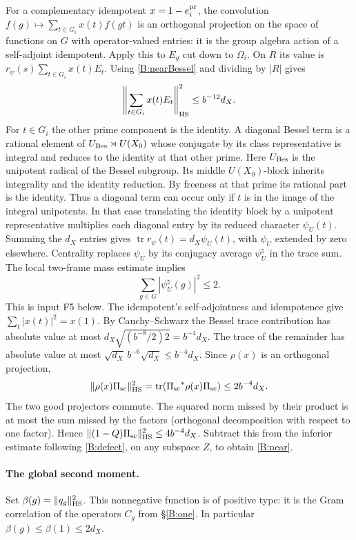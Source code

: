 For a complementary idempotent \(x=1-e_i^{\rm pr}\), the convolution
\(f(g)\mapsto\sum_{t\in G_i}x(t)f(gt)\) is an orthogonal projection
on the space of functions on \(G\) with operator-valued entries:
it is the group algebra action of a self-adjoint idempotent.
Apply this to \(E_g\) cut down to \(\Omega_i\). On \(R\)
its value is \(r_\psi(s)\sum_{t\in G_i}x(t)E_t\).
Using \eqref{B:nearBessel} and dividing by \(|R|\) gives
\[
 \left\|\sum_{t\in G_i}x(t)E_t\right\|_{\rm HS}^2\le b^{-12}d_X .
\]
For \(t\in G_i\) the other prime component is the identity.
A diagonal Bessel term is a rational element of \(U_{\rm Bes}\rtimes U(X_0)\)
whose conjugate by its class representative is integral and reduces
to the identity at that other prime. Here \(U_{\rm Bes}\) is the
unipotent radical of the Bessel subgroup. Its middle \(U(X_0)\)-block
inherits integrality and the identity reduction. By freeness at that
prime its rational part is the identity. Thus a diagonal term can
occur only if \(t\) is in the image of the integral unipotents. In
that case translating the identity block by a unipotent representative
multiplies each diagonal entry by its reduced character \(\psi_U(t)\).
Summing the \(d_X\) entries gives \(\operatorname{tr}r_\psi(t)=d_X\psi_U(t)\),
with \(\psi_U\) extended by zero elsewhere.
Centrality replaces \(\psi_U\) by its conjugacy average
\(\psi_U^\natural\) in the trace sum. The local two-frame mass
estimate implies
\begin{equation}\label{B:charmean}
 \sum_{g\in G}|\psi_U^\natural(g)|^2\le2 .
\end{equation}
This is input F5 below. The idempotent's self-adjointness and
idempotence give \(\sum_t|x(t)|^2=x(1)\). By Cauchy--Schwarz the
Bessel trace contribution has absolute value at most
\(d_X\sqrt{(b^{-8}/2)2}=b^{-4}d_X\).
The trace of the remainder has absolute value at most
\(\sqrt{d_X}\,b^{-6}\sqrt{d_X}\le b^{-4}d_X\).
Since \(\rho(x)\) is an orthogonal projection,
\[
 \|\rho(x){\Pi_{\rm sc}}\|_{\rm HS}^2
 =\operatorname{tr}({\Pi_{\rm sc}}^*\rho(x){\Pi_{\rm sc}})\le2b^{-4}d_X.
\]
The two good projectors commute. The squared norm missed by
their product is at most the sum missed by the factors
(orthogonal decomposition with respect to one factor).
Hence \(\|(1-Q){\Pi_{\rm sc}}\|_{\rm HS}^2\le4b^{-4}d_X\).
Subtract this from the inferior estimate following
\eqref{B:defect}, on any subspace \(Z\), to obtain \eqref{B:near}.

\paragraph{The global second moment.}
Set \(\beta(g)=\|q_g\|_{\rm HS}^2\). This nonnegative
function is of positive type: it is the Gram correlation of the
operators \(C_g\) from \S\ref{B:one}. In particular
\(\beta(g)\le\beta(1)\le2d_X\).

